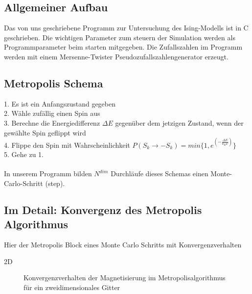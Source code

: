 \subsection{Allgemeiner Aufbau}

Das von uns geschriebene Programm zur Untersuchung des Ising-Modells ist in C geschrieben. Die wichtigen Parameter zum steuern der Simulation werden als Programmparameter beim starten mitgegeben. Die Zufallszahlen im Programm werden mit einem Mersenne-Twister Pseudozufallszahlengenerator erzeugt.

\subsection{Metropolis Schema}

1. Es ist ein Anfangszustand gegeben\\
2. Wähle zufällig einen Spin aus\\
3. Berechne die Energiedifferenz $\Delta E$ gegenüber dem jetzigen Zustand, wenn der gewählte Spin geflippt wird\\
4. Flippe den Spin mit Wahrscheinlichkeit $P(S_k \rightarrow -S_k)=min\{ 1, e^{(-\frac{\Delta E}{k_B T})} \}$\\
5. Gehe zu 1.\\\\
In unserem Programm bilden $N^{dim}$ Durchläufe dieses Schemas einen Monte-Carlo-Schritt (step).

\subsection{Im Detail: Konvergenz des Metropolis Algorithmus}

Hier der Metropolis Block eines Monte Carlo Schritts mit Konvergenzverhalten

2D

\begin{figure}[H]
	\centering
	\caption{Konvergenzverhalten der Magnetisierung im Metropolisalgorithmus für ein zweidimensionales Gitter}
	\label{mp2dkonv}
\end{figure}

